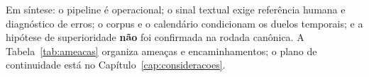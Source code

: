 Em síntese: o pipeline é operacional; o sinal textual exige referência humana e diagnóstico de erros; o corpus e o calendário condicionam os duelos temporais; e a hipótese de superioridade \textbf{não} foi confirmada na rodada canônica. A Tabela~\ref{tab:ameacas} organiza ameaças e encaminhamentos; o plano de continuidade está no Capítulo~\ref{cap:consideracoes}.

